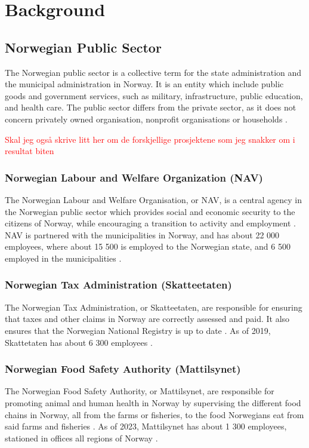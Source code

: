 \chapter{Background}

\section{Norwegian Public Sector}
The Norwegian public sector is a collective term for the state administration and the municipal administration in Norway. It is an entity which include public goods and government services, such as military, infrastructure, public education, and health care. The public sector differs from the private sector, as it does not concern privately owned organisation, nonprofit organisations or households \cite{os_snl_2022}\cite{ps_wiki_2023}.

\textcolor{red}{Skal jeg også skrive litt her om de forskjellige prosjektene som jeg snakker om i resultat biten}

\subsection{Norwegian Labour and Welfare Organization (NAV)}
The Norwegian Labour and Welfare Organisation, or NAV, is a central agency in the Norwegian public sector which provides social and economic security to the citizens of Norway, while encouraging a transition to activity and employment \cite{nav_r_2023}. NAV is partnered with the municipalities in Norway, and has about 22 000 employees, where about 15 500 is employed to the Norwegian state, and 6 500 employed in the municipalities \cite{org_nav_2023}. 

\subsection{Norwegian Tax Administration (Skatteetaten)}
The Norwegian Tax Administration, or Skatteetaten, are responsible for ensuring that taxes and other claims in Norway are correctly assessed and paid. It also ensures that the Norwegian National Registry is up to date \cite{skatt_r_2023}. As of 2019, Skattetaten has about 6 300 employees \cite{skatt_r_2023}. 

\subsection{Norwegian Food Safety Authority (Mattilsynet)}
The Norwegian Food Safety Authority, or Mattilsynet, are responsible for promoting animal and human health in Norway by supervising the different food chains in Norway, all from the farms or fisheries, to the food Norwegians eat from said farms and fisheries \cite{mat_r_2023}. As of 2023, Mattilsynet has about 1 300 employees, stationed in offices all regions of Norway \cite{org_mat_2023}.

